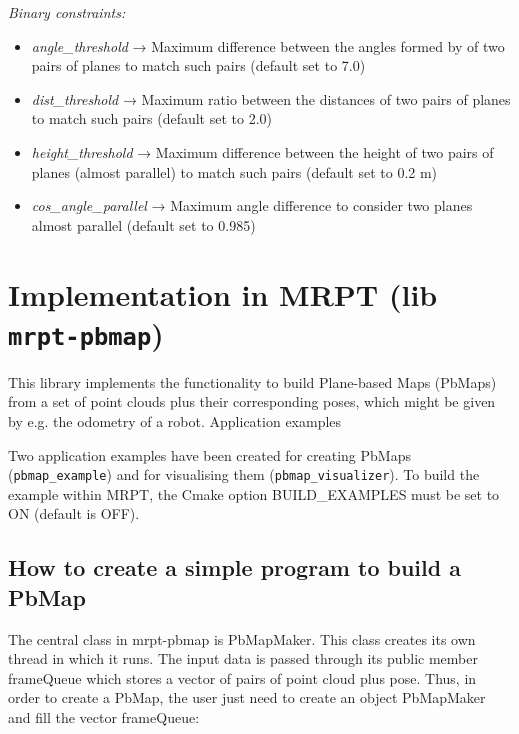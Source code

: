 \documentclass[a4paper,11pt]{article}
\begin{document}
\emph{Binary constraints:}
\begin{itemize}
\item \emph{angle\_threshold} → Maximum difference between the angles formed by of two pairs of planes to match such pairs (default set to 7.0)
\item \emph{dist\_threshold} → Maximum ratio between the distances of two pairs of planes to match such pairs (default set to 2.0)
\item \emph{height\_threshold} → Maximum difference between the height of two pairs of planes (almost parallel) to match such pairs (default set to 0.2 m)
\item \emph{cos\_angle\_parallel} → Maximum angle difference to consider two planes almost parallel (default set to 0.985)
\end{itemize}



\section{Implementation in MRPT (lib \texttt{mrpt-pbmap})}
\label{sect:implementation}

This library implements the functionality to build Plane-based Maps (PbMaps) from a set of point clouds plus their corresponding poses, which might be given by e.g. the odometry of a robot.
Application examples

Two application examples have been created for creating PbMaps \\ (\texttt{pbmap\_example}) and for visualising them (\texttt{pbmap\_visualizer}). To build the example within MRPT, the Cmake option BUILD\_EXAMPLES must be set to ON (default is OFF).

\subsection{How to create a simple program to build a PbMap}

The central class in mrpt-pbmap is PbMapMaker. This class creates its own thread in which it runs. The input data is passed through its public member frameQueue which stores a vector of pairs of point cloud plus pose. Thus, in order to create a PbMap, the user just need to create an object PbMapMaker and fill the vector frameQueue:
\end{document}
